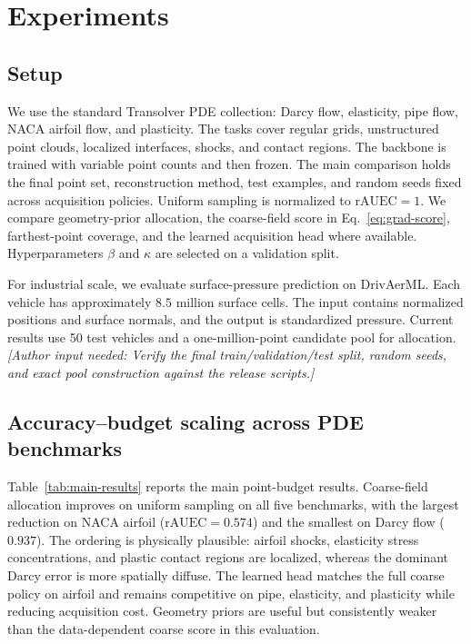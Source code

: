 \documentclass{article}
\newcommand{\rauec}{\mathrm{rAUEC}}
\newcommand{\todo}[1]{\textit{[Author input needed: #1]}}
\begin{document}
\section{Experiments}

\subsection{Setup}

We use the standard Transolver PDE collection: Darcy flow, elasticity, pipe
flow, NACA airfoil flow, and plasticity. The tasks cover regular grids,
unstructured point clouds, localized interfaces, shocks, and contact regions.
The backbone is trained with variable point counts and then frozen. The main
comparison holds the final point set, reconstruction method, test examples, and
random seeds fixed across acquisition policies. Uniform sampling is normalized
to $\rauec=1$. We compare geometry-prior allocation, the coarse-field score in
Eq.~\eqref{eq:grad-score}, farthest-point coverage, and the learned acquisition
head where available. Hyperparameters $\beta$ and $\kappa$ are selected on a
validation split.

For industrial scale, we evaluate surface-pressure prediction on DrivAerML.
Each vehicle has approximately $8.5$ million surface cells. The input contains
normalized positions and surface normals, and the output is standardized
pressure. Current results use 50 test vehicles and a one-million-point candidate
pool for allocation. \todo{Verify the final train/validation/test split, random
seeds, and exact pool construction against the release scripts.}

\subsection{Accuracy--budget scaling across PDE benchmarks}

Table~\ref{tab:main-results} reports the main point-budget results. Coarse-field
allocation improves on uniform sampling on all five benchmarks, with the
largest reduction on NACA airfoil ($\rauec=0.574$) and the smallest on Darcy
flow ($0.937$). The ordering is physically plausible: airfoil shocks,
elasticity stress concentrations, and plastic contact regions are localized,
whereas the dominant Darcy error is more spatially diffuse. The learned head
matches the full coarse policy on airfoil and remains competitive on pipe,
elasticity, and plasticity while reducing acquisition cost. Geometry priors are
useful but consistently weaker than the data-dependent coarse score in this
evaluation.
\end{document}
